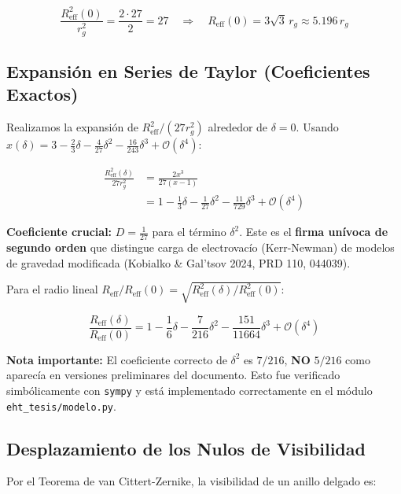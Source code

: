 \documentclass[12pt,a4paper]{article}
\begin{document}
\begin{equation}
\frac{R_{\text{eff}}^2(0)}{r_g^2} = \frac{2 \cdot 27}{2} = 27 \quad \Rightarrow \quad R_{\text{eff}}(0) = 3\sqrt{3} \, r_g \approx 5.196 \, r_g
\end{equation}

\subsection{Expansión en Series de Taylor (Coeficientes Exactos)}

Realizamos la expansión de $R_{\text{eff}}^2/(27 r_g^2)$ alrededor de $\delta=0$. Usando $x(\delta) = 3 - \frac{2}{3}\delta - \frac{4}{27}\delta^2 - \frac{16}{243}\delta^3 + \mathcal{O}(\delta^4)$:

\begin{align}
\frac{R_{\text{eff}}^2(\delta)}{27 r_g^2} &= \frac{2x^3}{27(x-1)} \\
&= 1 - \frac{1}{3}\delta - \frac{1}{27}\delta^2 - \frac{11}{729}\delta^3 + \mathcal{O}(\delta^4)
\end{align}

\textbf{Coeficiente crucial:} $D = \frac{1}{27}$ para el término $\delta^2$. Este es el \textbf{firma unívoca de segundo orden} que distingue carga de electrovacío (Kerr-Newman) de modelos de gravedad modificada (Kobialko \& Gal'tsov 2024, PRD 110, 044039).

Para el radio lineal $R_{\text{eff}}/R_{\text{eff}}(0) = \sqrt{R_{\text{eff}}^2(\delta)/R_{\text{eff}}^2(0)}$:

\begin{equation}
\frac{R_{\text{eff}}(\delta)}{R_{\text{eff}}(0)} = 1 - \frac{1}{6}\delta - \frac{7}{216}\delta^2 - \frac{151}{11664}\delta^3 + \mathcal{O}(\delta^4)
\end{equation}

\textbf{Nota importante:} El coeficiente correcto de $\delta^2$ es $7/216$, \textbf{NO} $5/216$ como aparecía en versiones preliminares del documento. Esto fue verificado simbólicamente con \texttt{sympy} y está implementado correctamente en el módulo \texttt{eht\_tesis/modelo.py}.

\subsection{Desplazamiento de los Nulos de Visibilidad}

Por el Teorema de van Cittert-Zernike, la visibilidad de un anillo delgado es:
\end{document}
